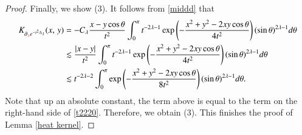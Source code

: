 \documentclass[12pt]{amsart}
\begin{document}
\begin{proof}
Finally, we show (3). It follows from \eqref{middd} that
\begin{align*}
K_{\partial_{{\color{red}x}}e^{-t^2 \Delta_\lambda}}(x,\,y)
&=  -C_\lambda\frac{x-y\cos\theta}{t^2}\int_0^\pi t^{-2\lambda-1}\exp\left(-\frac{x^2+y^2-2xy\cos\theta}{4t^2}\right)(\sin\theta)^{2\lambda-1}d\theta\\
&\lesssim\frac{|x-y|}{t^2}\int_0^\pi t^{-2\lambda-1}\exp\left(-\frac{x^2+y^2-2xy\cos\theta}{4t^2}\right)(\sin\theta)^{2\lambda-1}d\theta\\
&\lesssim t^{-2\lambda-2}\int_0^\pi \exp\left(-\frac{x^2+y^2-2xy\cos\theta}{8t^2}\right)(\sin\theta)^{2\lambda-1}d\theta.
\end{align*}
Note that up an absolute constant, the term above is equal to the term on the right-hand side of \eqref{t2220}. Therefore, we obtain (3). This finishes the proof of Lemma \ref{heat kernel}.
\end{proof}
\end{document}
